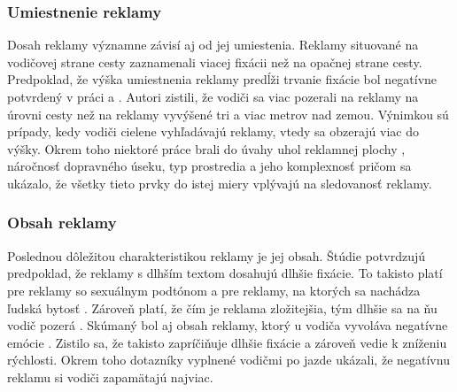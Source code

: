 \subsubsection{Umiestnenie reklamy}
Dosah reklamy významne závisí aj od jej umiestenia. Reklamy situované na vodičovej strane cesty zaznamenali viacej fixácii než na opačnej strane cesty. Predpoklad, že výška umiestnenia reklamy predĺži trvanie fixácie bol negatívne potvrdený v práci \cite{costa} a \cite{crundall}. Autori zistili, že vodiči sa viac pozerali na reklamy na úrovni cesty než na reklamy vyvýšené tri a viac metrov nad zemou. Výnimkou sú prípady, kedy vodiči cielene vyhľadávajú reklamy, vtedy sa obzerajú viac do výšky. Okrem toho niektoré práce brali do úvahy uhol reklamnej plochy \cite{zalesinska2018impact}, náročnosť dopravného úseku, typ prostredia a jeho komplexnosť \cite{costa, mollu2018driving} pričom sa ukázalo, že všetky tieto prvky do istej miery vplývajú na sledovanosť reklamy.

\subsubsection{Obsah reklamy}

Poslednou dôležitou charakteristikou reklamy je jej obsah. Štúdie \cite{harasimczuk2021longer, meuleners2020identifying} potvrdzujú predpoklad, že reklamy s dlhším textom dosahujú dlhšie fixácie. To takisto platí pre reklamy so sexuálnym podtónom \cite{MaliszewskiNorbert2019Iosa} a pre reklamy, na ktorých sa nachádza ľudská bytosť \cite{tarnowski2017roadside}. Zároveň platí, že čím je reklama zložitejšia, tým dlhšie sa na ňu vodič pozerá \cite{marciano2017effect}. Skúmaný bol aj obsah reklamy, ktorý u vodiča vyvoláva negatívne emócie \cite{chan2013emotional}. Zistilo sa, že takisto zapríčiňuje dlhšie fixácie a zároveň vedie k zníženiu rýchlosti. Okrem toho dotazníky vyplnené vodičmi po jazde ukázali, že negatívnu reklamu si vodiči zapamätajú najviac.



